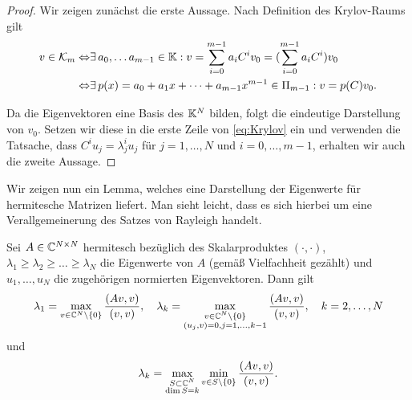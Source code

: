 \documentclass{article}
\begin{document}
\begin{proof}
	Wir zeigen zunächst die erste Aussage. Nach Definition des Krylov-Raums gilt
	\begin{align}
		v \in \mathcal{K}_m \Leftrightarrow& \exists \, a_0, \dots a_{m-1} \in \mathbb{K}: v = \sum_{i=0}^{m-1} a_i C^i v_0 = (\sum_{i=0}^{m-1} a_i C^i)v_0\\
		\Leftrightarrow& \exists \, p(x) = a_0 + a_1 x + \dots + a_{m-1} x^{m-1} \in \Pi_{m-1}: v = p(C)v_0.
		\label{eq:Krylov}
	\end{align}

	Da die Eigenvektoren eine Basis des $\mathbb{K}^N$ bilden, folgt die eindeutige Darstellung von $v_0$. Setzen wir diese in die erste Zeile von \ref{eq:Krylov} ein und verwenden die Tatsache, dass $C^i u_j = \lambda_j^i u_j$ für $j=1,\dots, N $ und $i = 0, \dots, m-1$, erhalten wir auch die zweite Aussage.
\end{proof}

Wir zeigen nun ein Lemma, welches eine Darstellung der Eigenwerte für hermitesche Matrizen liefert. Man sieht leicht, dass es sich hierbei um eine Verallgemeinerung des Satzes von Rayleigh handelt.

\begin{lemma}
	Sei $A \in \mathbb{C}^{N \times N}$ hermitesch bezüglich des Skalarproduktes $(\cdot, \cdot)$, $\lambda_1 \geq \lambda_2 \geq \dots \geq \lambda_N$ die Eigenwerte von $A$ (gemäß Vielfachheit gezählt) und $u_1, \dots, u_N$ die zugehörigen normierten Eigenvektoren. Dann gilt
	\begin{align}\label{lambdamax}
		\lambda_1 = \max_{v \in \mathbb{C}^N \setminus \{0\}} \frac{(Av,v)}{(v,v)}, \quad \lambda_k = \max_{\substack{v \in \mathbb{C}^N \setminus \{0\}\\
    (u_j,v) = 0, j= 1,\dots, k-1}} \frac{(Av,v)}{(v,v)}, \quad k= 2, \dots, N
	\end{align}
	und
	\begin{align}\label{lambdamaxmin}
		\lambda_k = \max_{\substack{S \subset \mathbb{C}^N\\
    \dim S = k}} \min_{v \in S \setminus \{0\}} \frac{(Av,v)}{(v,v)}.
	\end{align}
\end{lemma}
\end{document}
